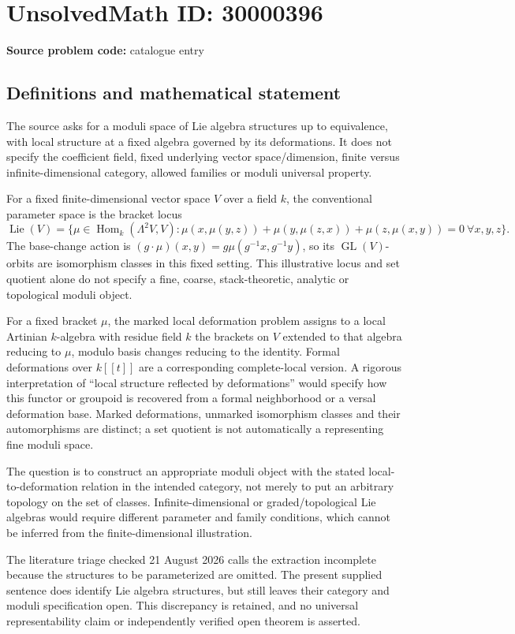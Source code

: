 \documentclass[11pt]{article}
\begin{document}
\section*{UnsolvedMath ID: 30000396}
\textbf{Source problem code:} catalogue entry
\subsection{Definitions and mathematical statement}
The source asks for a moduli space of Lie algebra structures up to equivalence, with local structure at a fixed algebra governed by its deformations. It does not specify the coefficient field, fixed underlying vector space/dimension, finite versus infinite-dimensional category, allowed families or moduli universal property.

For a fixed finite-dimensional vector space $V$ over a field $k$, the conventional parameter space is the bracket locus
\[
 \operatorname{Lie}(V)=\{\mu\in\operatorname{Hom}_k(\Lambda^2V,V):
 \mu(x,\mu(y,z))+\mu(y,\mu(z,x))+\mu(z,\mu(x,y))=0\ \forall x,y,z\}.
\]
The base-change action is $(g\cdot\mu)(x,y)=g\mu(g^{-1}x,g^{-1}y)$, so its $\operatorname{GL}(V)$-orbits are isomorphism classes in this fixed setting. This illustrative locus and set quotient alone do not specify a fine, coarse, stack-theoretic, analytic or topological moduli object.

For a fixed bracket $\mu$, the marked local deformation problem assigns to a local Artinian $k$-algebra with residue field $k$ the brackets on $V$ extended to that algebra reducing to $\mu$, modulo basis changes reducing to the identity. Formal deformations over $k[[t]]$ are a corresponding complete-local version. A rigorous interpretation of ``local structure reflected by deformations'' would specify how this functor or groupoid is recovered from a formal neighborhood or a versal deformation base. Marked deformations, unmarked isomorphism classes and their automorphisms are distinct; a set quotient is not automatically a representing fine moduli space.

The question is to construct an appropriate moduli object with the stated local-to-deformation relation in the intended category, not merely to put an arbitrary topology on the set of classes. Infinite-dimensional or graded/topological Lie algebras would require different parameter and family conditions, which cannot be inferred from the finite-dimensional illustration.

The literature triage checked 21 August 2026 calls the extraction incomplete because the structures to be parameterized are omitted. The present supplied sentence does identify Lie algebra structures, but still leaves their category and moduli specification open. This discrepancy is retained, and no universal representability claim or independently verified open theorem is asserted.
\end{document}
